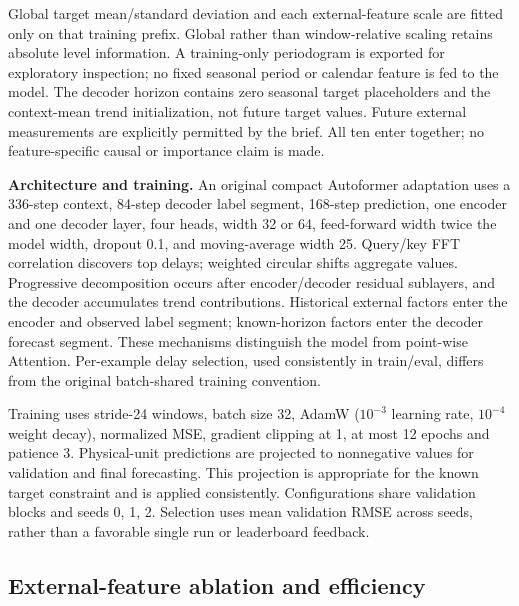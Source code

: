 \documentclass[10pt]{article}
\begin{document}
Global target mean/standard deviation and each external-feature scale are fitted only on that training prefix. Global rather than window-relative scaling retains absolute level information. A training-only periodogram is exported for exploratory inspection; no fixed seasonal period or calendar feature is fed to the model. The decoder horizon contains zero seasonal target placeholders and the context-mean trend initialization, not future target values. Future external measurements are explicitly permitted by the brief. All ten enter together; no feature-specific causal or importance claim is made.

\textbf{Architecture and training.} An original compact Autoformer adaptation uses a 336-step context, 84-step decoder label segment, 168-step prediction, one encoder and one decoder layer, four heads, width 32 or 64, feed-forward width twice the model width, dropout 0.1, and moving-average width 25. Query/key FFT correlation discovers top delays; weighted circular shifts aggregate values. Progressive decomposition occurs after encoder/decoder residual sublayers, and the decoder accumulates trend contributions. Historical external factors enter the encoder and observed label segment; known-horizon factors enter the decoder forecast segment. These mechanisms distinguish the model from point-wise Attention. Per-example delay selection, used consistently in train/eval, differs from the original batch-shared training convention.

Training uses stride-24 windows, batch size 32, AdamW ($10^{-3}$ learning rate, $10^{-4}$ weight decay), normalized MSE, gradient clipping at 1, at most 12 epochs and patience 3. Physical-unit predictions are projected to nonnegative values for validation and final forecasting. This projection is appropriate for the known target constraint and is applied consistently. Configurations share validation blocks and seeds 0, 1, 2. Selection uses mean validation RMSE across seeds, rather than a favorable single run or leaderboard feedback.

\subsection*{External-feature ablation and efficiency}
\end{document}
